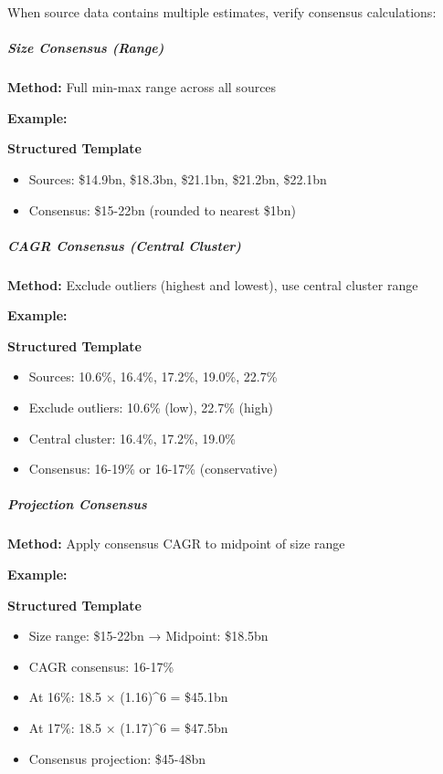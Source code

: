 \documentclass[11pt]{article}
\begin{document}
When source data contains multiple estimates, verify consensus calculations:


\subparagraph{Size Consensus (Range)}\mbox{}\par

\textbf{Method:} Full min-max range across all sources


\textbf{Example:}

\textbf{Structured Template}
\begin{itemize}[leftmargin=*,itemsep=2pt,topsep=2pt]
\item {} Sources: \$14.9bn, \$18.3bn, \$21.1bn, \$21.2bn, \$22.1bn
\item {} Consensus: \$15-22bn (rounded to nearest \$1bn)
\end{itemize}

\subparagraph{CAGR Consensus (Central Cluster)}\mbox{}\par

\textbf{Method:} Exclude outliers (highest and lowest), use central cluster range


\textbf{Example:}

\textbf{Structured Template}
\begin{itemize}[leftmargin=*,itemsep=2pt,topsep=2pt]
\item {} Sources: 10.6\%, 16.4\%, 17.2\%, 19.0\%, 22.7\%
\item {} Exclude outliers: 10.6\% (low), 22.7\% (high)
\item {} Central cluster: 16.4\%, 17.2\%, 19.0\%
\item {} Consensus: 16-19\% or 16-17\% (conservative)
\end{itemize}

\subparagraph{Projection Consensus}\mbox{}\par

\textbf{Method:} Apply consensus CAGR to midpoint of size range


\textbf{Example:}

\textbf{Structured Template}
\begin{itemize}[leftmargin=*,itemsep=2pt,topsep=2pt]
\item {} Size range: \$15-22bn → Midpoint: \$18.5bn
\item {} CAGR consensus: 16-17\%
\item {} At 16\%: 18.5 × (1.16)\textasciicircum{}6 = \$45.1bn
\item {} At 17\%: 18.5 × (1.17)\textasciicircum{}6 = \$47.5bn
\item {} Consensus projection: \$45-48bn
\end{itemize}
\end{document}
